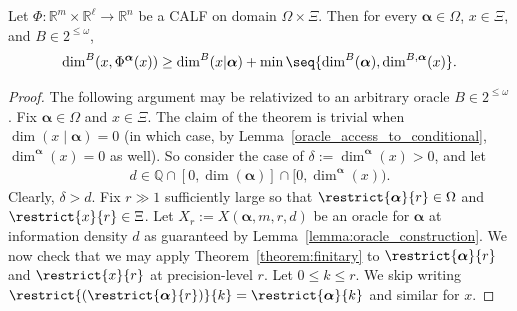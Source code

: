 \begin{theorem}
    \label{theorem:infinitary}
    Let $\Phi : \mathbb{R}^m \times \mathbb{R}^\ell \to \mathbb{R}^n$ be a CALF on domain $\Omega \times \Xi$. Then for every $\boldsymbol{\alpha} \in \Omega$, $x \in \Xi$, and $B \in 2^{\leq \omega}$,
    \begin{align*}
        \dim^B(x, \Phi^{\boldsymbol{\alpha}}(x)) \geq \dim^B(x | \boldsymbol{\alpha}) + \min \seq{\dim^B(\boldsymbol{\alpha}), \dim^{B, \boldsymbol{\alpha}}(x)}.
    \end{align*}
\end{theorem}
\begin{proof}
    The following argument may be relativized to an arbitrary oracle $B \in 2^{\leq \omega}$. Fix $\boldsymbol{\alpha} \in \Omega$ and $x \in \Xi$. The claim of the theorem is trivial when $\dim(x \mid \boldsymbol{\alpha}) = 0$ (in which case, by Lemma~\ref{oracle_access_to_conditional}, $\dim^{\boldsymbol{\alpha}}(x) = 0$ as well). So consider the case of $\delta := \dim^{\boldsymbol{\alpha}}(x) > 0$, and let
    \begin{align*}
        d \in \mathbb{Q} \cap [0, \dim(\boldsymbol{\alpha})] \cap [0, \dim^{\boldsymbol{\alpha}}(x)).
    \end{align*}
    Clearly, $\delta > d$. Fix $r \gg 1$ sufficiently large so that $\restrict{\boldsymbol{\alpha}}{r} \in \Omega$ and $\restrict{x}{r} \in \Xi$. Let $X_r := X(\boldsymbol{\alpha}, m, r, d)$ be an oracle for $\boldsymbol{\alpha}$ at information density $d$ as guaranteed by Lemma~\ref{lemma:oracle_construction}. We now check that we may apply Theorem~\ref{theorem:finitary} to $\restrict{\boldsymbol{\alpha}}{r}$ and $\restrict{x}{r}$ at precision-level $r$. Let $0 \leq k \leq r$. We skip writing $\restrict{(\restrict{\boldsymbol{\alpha}}{r})}{k} = \restrict{\boldsymbol{\alpha}}{k}$ and similar for $x$.
    

\end{proof}
